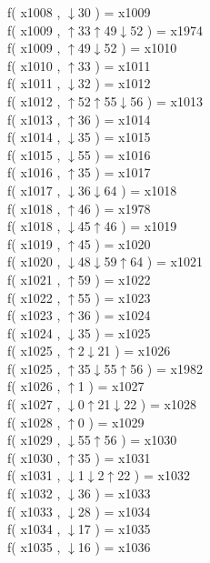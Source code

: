 f( x1008 , $\downarrow$30 ) = x1009 \\
f( x1009 , $\uparrow$33$\uparrow$49$\downarrow$52 ) = x1974 \\
f( x1009 , $\uparrow$49$\downarrow$52 ) = x1010 \\
f( x1010 , $\uparrow$33 ) = x1011 \\
f( x1011 , $\downarrow$32 ) = x1012 \\
f( x1012 , $\uparrow$52$\uparrow$55$\downarrow$56 ) = x1013 \\
f( x1013 , $\uparrow$36 ) = x1014 \\
f( x1014 , $\downarrow$35 ) = x1015 \\
f( x1015 , $\downarrow$55 ) = x1016 \\
f( x1016 , $\uparrow$35 ) = x1017 \\
f( x1017 , $\downarrow$36$\downarrow$64 ) = x1018 \\
f( x1018 , $\uparrow$46 ) = x1978 \\
f( x1018 , $\downarrow$45$\uparrow$46 ) = x1019 \\
f( x1019 , $\uparrow$45 ) = x1020 \\
f( x1020 , $\downarrow$48$\downarrow$59$\uparrow$64 ) = x1021 \\
f( x1021 , $\uparrow$59 ) = x1022 \\
f( x1022 , $\uparrow$55 ) = x1023 \\
f( x1023 , $\uparrow$36 ) = x1024 \\
f( x1024 , $\downarrow$35 ) = x1025 \\
f( x1025 , $\uparrow$2$\downarrow$21 ) = x1026 \\
f( x1025 , $\uparrow$35$\downarrow$55$\uparrow$56 ) = x1982 \\
f( x1026 , $\uparrow$1 ) = x1027 \\
f( x1027 , $\downarrow$0$\uparrow$21$\downarrow$22 ) = x1028 \\
f( x1028 , $\uparrow$0 ) = x1029 \\
f( x1029 , $\downarrow$55$\uparrow$56 ) = x1030 \\
f( x1030 , $\uparrow$35 ) = x1031 \\
f( x1031 , $\downarrow$1$\downarrow$2$\uparrow$22 ) = x1032 \\
f( x1032 , $\downarrow$36 ) = x1033 \\
f( x1033 , $\downarrow$28 ) = x1034 \\
f( x1034 , $\downarrow$17 ) = x1035 \\
f( x1035 , $\downarrow$16 ) = x1036 \\
